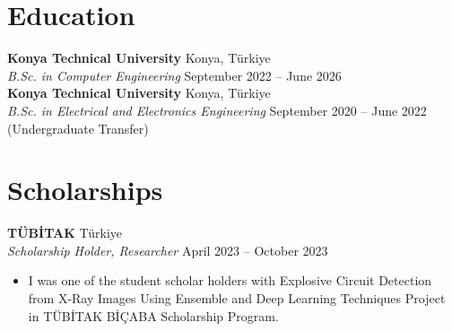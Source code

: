 \documentclass[10pt,a4paper]{extarticle}
\begin{document}
\section{Education}
\textbf{Konya Technical University} \hfill Konya, Türkiye\\
\textit{B.Sc. in Computer Engineering} \hfill September 2022 -- June 2026\\
\textbf{Konya Technical University} \hfill Konya, Türkiye\\
\textit{B.Sc. in Electrical and Electronics Engineering} \hfill September 2020 -- June 2022 (Undergraduate Transfer)\\
\section{Scholarships}
\textbf{TÜBİTAK} \hfill Türkiye\\
\textit{Scholarship Holder, Researcher} \hfill April 2023 -- October 2023
\begin{itemize}[leftmargin=*,noitemsep,topsep=0pt]
    \item I was one of the student scholar holders with Explosive Circuit Detection from X-Ray Images Using Ensemble and Deep Learning Techniques Project in TÜBİTAK BİÇABA Scholarship Program.
\end{itemize}
\end{document}
